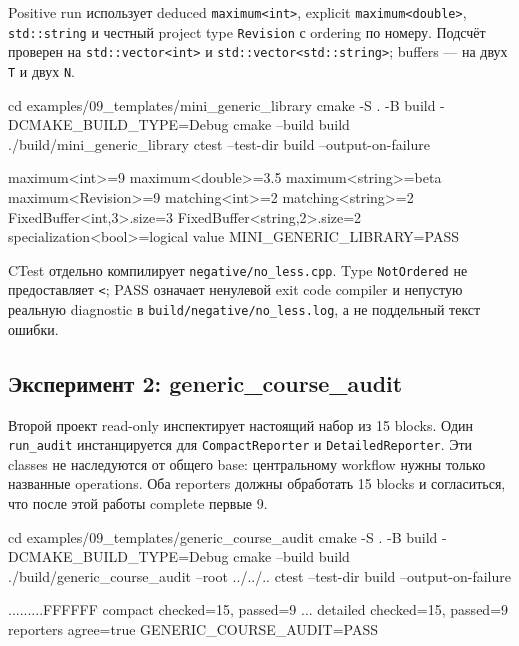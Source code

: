 Positive run использует deduced \texttt{maximum<int>}, explicit
\texttt{maximum<double>}, \texttt{std::string} и честный project type
\texttt{Revision} с ordering по номеру. Подсчёт проверен на
\texttt{std::vector<int>} и \texttt{std::vector<std::string>}; buffers --- на
двух \texttt{T} и двух \texttt{N}.

\begin{shellcode}
cd examples/09_templates/mini_generic_library
cmake -S . -B build -DCMAKE_BUILD_TYPE=Debug
cmake --build build
./build/mini_generic_library
ctest --test-dir build --output-on-failure
\end{shellcode}

\begin{outputcode}
maximum<int>=9
maximum<double>=3.5
maximum<string>=beta
maximum<Revision>=9
matching<int>=2
matching<string>=2
FixedBuffer<int,3>.size=3
FixedBuffer<string,2>.size=2
specialization<bool>=logical value
MINI_GENERIC_LIBRARY=PASS
\end{outputcode}

CTest отдельно компилирует \texttt{negative/no\_less.cpp}. Type
\texttt{NotOrdered} не предоставляет \texttt{<}; PASS означает ненулевой exit
code compiler и непустую реальную diagnostic в
\texttt{build/negative/no\_less.log}, а не поддельный текст ошибки.

\subsection{Эксперимент 2: generic\_course\_audit}

Второй проект read-only инспектирует настоящий набор из 15 blocks. Один
\texttt{run\_audit} инстанцируется для \texttt{CompactReporter} и
\texttt{DetailedReporter}. Эти classes не наследуются от общего base:
центральному workflow нужны только названные operations. Оба reporters должны
обработать 15 blocks и согласиться, что после этой работы complete первые 9.

\begin{shellcode}
cd examples/09_templates/generic_course_audit
cmake -S . -B build -DCMAKE_BUILD_TYPE=Debug
cmake --build build
./build/generic_course_audit --root ../../..
ctest --test-dir build --output-on-failure
\end{shellcode}

\begin{outputcode}
.........FFFFFF compact checked=15, passed=9
...
detailed checked=15, passed=9
reporters agree=true
GENERIC_COURSE_AUDIT=PASS
\end{outputcode}

